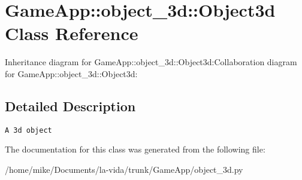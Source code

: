 \hypertarget{classGameApp_1_1object__3d_1_1Object3d}{
\section{GameApp::object\_\-3d::Object3d Class Reference}
\label{classGameApp_1_1object__3d_1_1Object3d}
}
Inheritance diagram for GameApp::object\_\-3d::Object3d:Collaboration diagram for GameApp::object\_\-3d::Object3d:

\subsection{Detailed Description}


\footnotesize\begin{verbatim}A 3d object\end{verbatim}
\normalsize
 

The documentation for this class was generated from the following file:\begin{CompactItemize}
\item 
/home/mike/Documents/la-vida/trunk/GameApp/object\_\-3d.py\end{CompactItemize}
